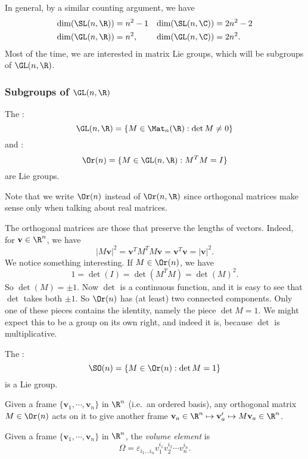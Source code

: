 \documentclass[a4paper]{article}
\begin{document}
In general, by a similar counting argument, we have
\begin{align*}
  \dim (\SL(n, \R)) &= n^2 - 1& \dim (\SL(n, \C)) &= 2n^2 - 2\\
  \dim (\GL(n, \R)) &= n^2,& \dim(\GL(n, \C)) &= 2n^2.
\end{align*}
Most of the time, we are interested in matrix Lie groups, which will be subgroups of $\GL(n, \R)$.

\subsubsection*{Subgroups of \texorpdfstring{$\GL(n, \R)$}{GL(n, R)}}
\begin{lemma}
  The :
  \[
    \GL(n, \R) = \{M \in \Mat_n(\R): \det M \not= 0\}
  \]
  and :
  \[
    \Or(n) = \{M \in \GL(n, \R): M^TM = I\}
  \]
  are Lie groups.
\end{lemma}
Note that we write $\Or(n)$ instead of $\Or(n, \R)$ since orthogonal matrices make sense only when talking about real matrices.

The orthogonal matrices are those that preserve the lengths of vectors. Indeed, for $\mathbf{v}\in \R^n$, we have
\[
  |M\mathbf{v}|^2 = \mathbf{v}^T M^T M \mathbf{v} = \mathbf{v}^T \mathbf{v} = |\mathbf{v}|^2.
\]
We notice something interesting. If $M \in \Or(n)$, we have
\[
  1 = \det(I) = \det(M^TM) = \det(M)^2.
\]
So $\det(M) = \pm 1$. Now $\det$ is a continuous function, and it is easy to see that $\det$ takes both $\pm 1$. So $\Or(n)$ has (at least) two connected components. Only one of these pieces contains the identity, namely the piece $\det M = 1$. We might expect this to be a group on its own right, and indeed it is, because $\det$ is multiplicative.
\begin{lemma}
  The  :
  \[
    \SO(n) = \{M \in \Or(n): \det M = 1\}
  \]
  is a Lie group.
\end{lemma}

Given a frame $\{\mathbf{v}_1, \cdots, \mathbf{v}_n\}$ in $\R^n$ (i.e.\ an ordered basis), any orthogonal matrix $M \in \Or(n)$ acts on it to give another frame $\mathbf{v}_a \in \R^n \mapsto \mathbf{v}_a' \mapsto M\mathbf{v}_a \in \R^n$.
\begin{defi}
  Given a frame $\{\mathbf{v}_1, \cdots, \mathbf{v}_n\}$ in $\R^n$, the \emph{volume element} is
  \[
    \Omega = \varepsilon_{i_1 \ldots i_n} v_1^{i_1} v_2^{i_2} \cdots v_n^{i_n}.
  \]
\end{defi}
\end{document}
